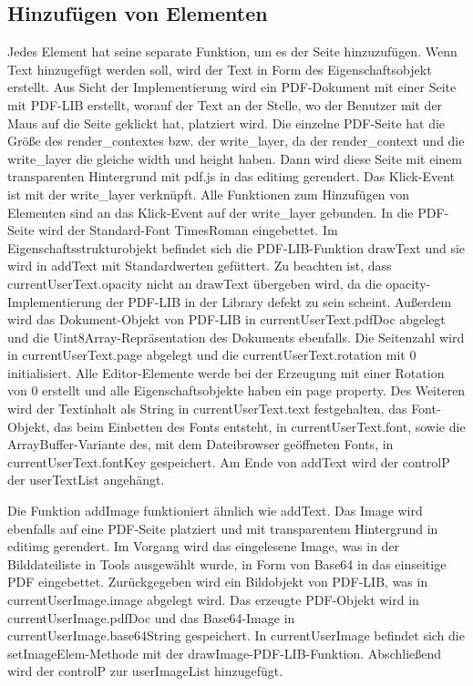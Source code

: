 \subsection{Hinzufügen von Elementen}
Jedes Element hat seine separate Funktion, um es der Seite hinzuzufügen. Wenn Text hinzugefügt werden soll, wird der Text in Form des Eigenschaftsobjekt erstellt. Aus Sicht der Implementierung wird ein PDF-Dokument mit einer Seite mit PDF-LIB erstellt, worauf der Text an der Stelle, wo der Benutzer mit der Maus auf die Seite geklickt hat, platziert wird. Die einzelne PDF-Seite hat die Größe des render\_contextes bzw. der write\_layer, da der render\_context und die write\_layer die gleiche width und height haben. Dann wird diese Seite mit einem transparenten Hintergrund mit pdf.js in das editimg gerendert. Das Klick-Event ist mit der write\_layer verknüpft. Alle Funktionen zum Hinzufügen von Elementen sind an das Klick-Event auf der write\_layer gebunden. In die PDF-Seite wird der Standard-Font TimesRoman eingebettet. Im Eigenschaftsstrukturobjekt befindet sich die PDF-LIB-Funktion drawText und sie wird in addText mit Standardwerten gefüttert. Zu beachten ist, dass currentUserText.opacity nicht an drawText übergeben wird, da die opacity-Implementierung der PDF-LIB in der Library defekt zu sein scheint. Außerdem wird das Dokument-Objekt von PDF-LIB in currentUserText.pdfDoc abgelegt und die Uint8Array-Repräsentation des Dokuments ebenfalls. Die Seitenzahl wird in currentUserText.page abgelegt und die currentUserText.rotation mit 0 initialisiert. Alle Editor-Elemente werde bei der Erzeugung mit einer Rotation von 0 erstellt und alle Eigenschaftsobjekte haben ein page property. Des Weiteren wird der Textinhalt als String in currentUserText.text festgehalten, das Font-Objekt, das beim Einbetten des Fonts entsteht, in currentUserText.font, sowie die ArrayBuffer-Variante des, mit dem Dateibrowser geöffneten Fonts, in currentUserText.fontKey gespeichert. Am Ende von addText wird der controlP der userTextList angehängt.
\par
Die Funktion addImage funktioniert ähnlich wie addText. Das Image wird ebenfalls auf eine PDF-Seite platziert und mit transparentem Hintergrund in editimg gerendert. Im Vorgang wird das eingelesene Image, was in der Bilddateiliste in Tools ausgewählt wurde, in Form von Base64 in das einseitige PDF eingebettet. Zurückgegeben wird ein Bildobjekt von PDF-LIB, was in currentUserImage.image abgelegt wird. Das erzeugte PDF-Objekt wird in currentUserImage.pdfDoc und das Base64-Image in currentUserImage.base64String gespeichert. In currentUserImage befindet sich die setImageElem-Methode mit der drawImage-PDF-LIB-Funktion. Abschließend wird der controlP zur userImageList hinzugefügt.
